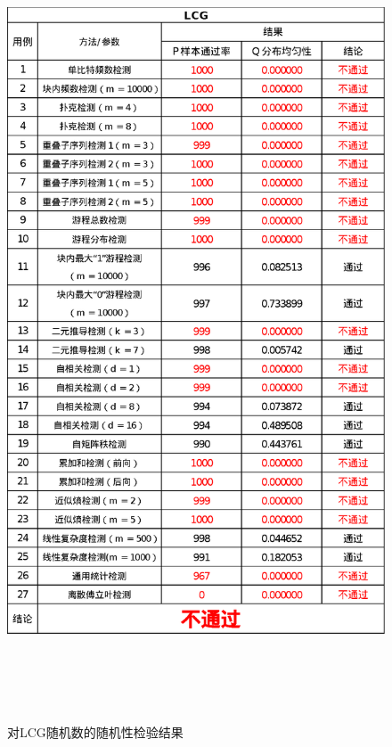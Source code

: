 \documentclass[12pt,a4paper]{article}%
\begin{document}
    \begin{figure}
        \centering
        \includegraphics[height=23.7cm]{LCG}
        \caption{对LCG随机数的随机性检验结果}
        \label{fig:fig.2}
        \hypertarget{fig:fig.2}{}

    \end{figure}
\end{document}
